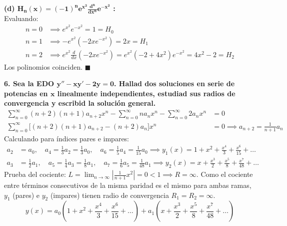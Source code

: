 \documentclass[11pt, a4paper]{article}
\begin{document}
\vspace{0.2cm}\noindent\textbf{(d) $\bm{H_n(x) = (-1)^n e^{x^2} \frac{d^n}{dx^n} e^{-x^2}}$ :} \\
 Evaluando:
\begin{align*}
n=0 &\implies e^{x^2} e^{-x^2} = 1 = H_0 \\
n=1 &\implies -e^{x^2} (-2x e^{-x^2}) = 2x = H_1 \\
n=2 &\implies e^{x^2} \frac{d}{dx}(-2x e^{-x^2}) = e^{x^2}(-2 + 4x^2)e^{-x^2} = 4x^2 - 2 = H_2
\end{align*}
Los polinomios coinciden. \quad $\blacksquare$


\noindent\textbf{6. Sea la EDO $\bm{y''-xy'-2y=0}$. Hallad dos soluciones en serie de potencias en $\bm{x}$ linealmente independientes, estudiad sus radios de convergencia y escribid la solución general.} \\
\begin{align*}
\sum_{n=0}^{\infty} (n+2)(n+1)a_{n+2} x^n - \sum_{n=0}^{\infty} n a_n x^n - \sum_{n=0}^{\infty} 2 a_n x^n &= 0 \\
\sum_{n=0}^{\infty} \big[ (n+2)(n+1)a_{n+2} - (n+2)a_n \big] x^n &= 0 \implies a_{n+2} = \frac{1}{n+1} a_n
\end{align*}
Calculando para índices pares e impares:
\begin{align*}
a_2 &= a_0, \quad a_4 = \frac{1}{3}a_2 = \frac{1}{3}a_0, \quad a_6 = \frac{1}{5}a_4 = \frac{1}{15}a_0 \implies y_1(x) = 1 + x^2 + \frac{x^4}{3} + \frac{x^6}{15} + \dots \\
a_3 &= \frac{1}{2}a_1, \quad a_5 = \frac{1}{4}a_3 = \frac{1}{8}a_1, \quad a_7 = \frac{1}{6}a_5 = \frac{1}{48}a_1 \implies y_2(x) = x + \frac{x^3}{2} + \frac{x^5}{8} + \frac{x^7}{48} + \dots 
\end{align*}
Prueba del cociente: $L = \lim_{n\to\infty} \left| \frac{1}{n+1} x^2 \right| = 0 < 1 \implies R = \infty$. Como el cociente entre términos consecutivos de la misma paridad es el mismo para ambas ramas, $y_1$ (pares) e $y_2$ (impares) tienen radio de convergencia $R_1=R_2=\infty$.
\[
\boxed{y(x) = a_0\left(1 + x^2 + \frac{x^4}{3} + \frac{x^6}{15} + \dots\right) + a_1\left(x + \frac{x^3}{2} + \frac{x^5}{8} + \frac{x^7}{48} + \dots\right)}
\]
\end{document}

